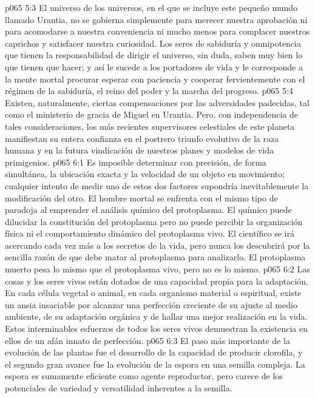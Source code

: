 \vs p065 5:3 El universo de los universos, en el que se incluye este pequeño mundo llamado Urantia, no se gobierna simplemente para merecer nuestra aprobación ni para acomodarse a nuestra conveniencia ni mucho menos para complacer nuestros caprichos y satisfacer nuestra curiosidad. Los seres de sabiduría y omnipotencia que tienen la responsabilidad de dirigir el universo, sin duda, saben muy bien lo que tienen que hacer; y así le sucede a los portadores de vida y le corresponde a la mente mortal procurar esperar con paciencia y cooperar fervientemente con el régimen de la sabiduría, el reino del poder y la marcha del progreso.
\vs p065 5:4 Existen, naturalmente, ciertas compensaciones por las adversidades padecidas, tal como el ministerio de gracia de Miguel en Urantia. Pero, con independencia de tales consideraciones, los más recientes supervisores celestiales de este planeta manifiestan su entera confianza en el postrero triunfo evolutivo de la raza humana y en la futura vindicación de nuestros planes y modelos de vida primigenios.
\vs p065 6:1 Es imposible determinar con precisión, de forma simultánea, la ubicación exacta y la velocidad de un objeto en movimiento; cualquier intento de medir uno de estos dos factores supondría inevitablemente la modificación del otro. El hombre mortal se enfrenta con el mismo tipo de paradoja al emprender el análisis químico del protoplasma. El químico puede dilucidar la constitución del protoplasma  pero no puede percibir la organización física ni el comportamiento dinámico del protoplasma vivo. El científico se irá acercando cada vez más a los secretos de la vida, pero nunca los descubrirá por la sencilla razón de que debe matar al protoplasma para analizarlo. El protoplasma muerto pesa lo mismo que el protoplasma vivo, pero no es lo mismo.
\vs p065 6:2 \pc Las cosas y los seres vivos están dotados de una capacidad propia para la adaptación. En cada célula  vegetal o animal, en cada organismo  material o espiritual, existe un ansia insaciable por alcanzar una perfección creciente de su ajuste al medio ambiente, de su adaptación orgánica y de hallar una mejor realización en la vida. Estos interminables esfuerzos de todos los seres vivos demuestran la existencia en ellos de un afán innato de perfección.
\vs p065 6:3 El paso más importante de la evolución de las plantas fue el desarrollo de la capacidad de producir clorofila, y el segundo gran avance fue la evolución de la espora en una semilla compleja. La espora es sumamente eficiente como agente reproductor, pero carece de los potenciales de variedad y versatilidad inherentes a la semilla.

